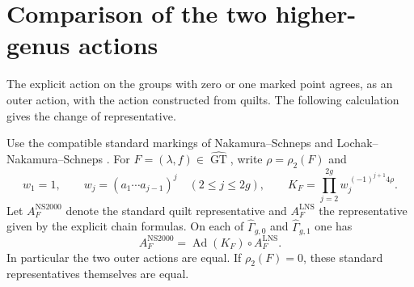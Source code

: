 \section{Comparison of the two higher-genus actions}
The explicit action on the groups with zero or one marked point agrees,
as an outer action, with the action constructed from quilts. The following
calculation gives the change of representative.

\begin{proposition}\label{prop:ns-lns-comparison}
Use the compatible standard markings of Nakamura--Schneps
\cite[Theorem 11.2]{NS2000} and Lochak--Nakamura--Schneps
\cite[Theorem 1.1]{LNS}. For $F=(\lambda,f)\in\widehat{\operatorname{GT}}$,
write $\rho=\rho_2(F)$ and
\[
 w_1=1,\qquad w_j=(a_1\cdots a_{j-1})^j\quad(2\leq j\leq2g),
 \qquad
 K_F=\prod_{j=2}^{2g}w_j^{\,(-1)^{j+1}4\rho}.
\]
Let $A_F^{\mathrm{NS2000}}$ denote the standard quilt representative and
$A_F^{\mathrm{LNS}}$ the representative given by the explicit chain
formulas. On each of $\widehat\Gamma_{g,0}$ and
$\widehat\Gamma_{g,1}$ one has
\[
 A_F^{\mathrm{NS2000}}=\operatorname{Ad}(K_F)\circ A_F^{\mathrm{LNS}}.
\]
In particular the two outer actions are equal. If $\rho_2(F)=0$, these
standard representatives themselves are equal.
\end{proposition}
